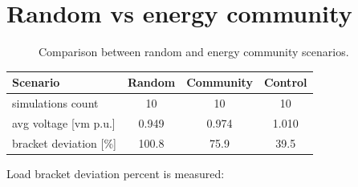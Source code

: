 \documentclass[a4paper,10pt]{report}
\begin{document}
\section{Random vs energy community}\label{section_rand_vs_comm}
\FloatBarrier
\begin{figure}[htpb]
	\centering
	\qquad
	\caption{Comparison between random and energy community scenarios.}%
	\label{random_vs_en_comm}%
\end{figure}
\FloatBarrier


\begin{table}[htpb]
	\centering
	\begin{tabular}{lccc}
		\toprule
		Scenario & Random & Community & Control \\
		\midrule
		simulations count & 10 & 10 & 10 \\
		avg voltage [vm p.u.] & 0.949 & 0.974 & 1.010 \\
		bracket deviation [\%] & 100.8 & 75.9 & 39.5 \\
		\bottomrule
	\end{tabular}
\label{random_vs_comm}
\end{table}

Load bracket deviation percent is measured:
\end{document}
